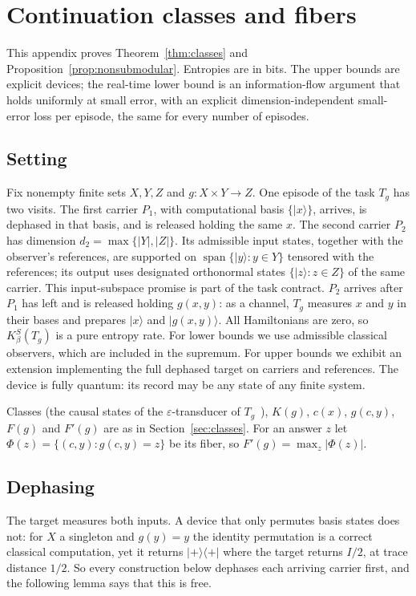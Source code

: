 \section{Continuation classes and fibers}\label{app:classes}

This appendix proves Theorem~\ref{thm:classes} and Proposition~\ref{prop:nonsubmodular}. Entropies are in bits. The upper bounds are explicit devices; the real-time lower bound is an information-flow argument that holds uniformly at small error, with an explicit dimension-independent small-error loss per episode, the same for every number of episodes.

\subsection{Setting}

Fix nonempty finite sets $X,Y,Z$ and $g:X\times Y\to Z$. One episode of the task $T_g$ has two visits. The first carrier $P_1$, with computational basis $\{|x\rangle\}$, arrives, is dephased in that basis, and is released holding the same $x$. The second carrier $P_2$ has dimension $d_2=\max\{|Y|,|Z|\}$. Its admissible input states, together with the observer's references, are supported on $\operatorname{span}\{|y\rangle:y\in Y\}$ tensored with the references; its output uses designated orthonormal states $\{|z\rangle:z\in Z\}$ of the same carrier. This input-subspace promise is part of the task contract. $P_2$ arrives after $P_1$ has left and is released holding $g(x,y)$: as a channel, $T_g$ measures $x$ and $y$ in their bases and prepares $|x\rangle$ and $|g(x,y)\rangle$. All Hamiltonians are zero, so $K_\beta^S(T_g)$ is a pure entropy rate. For lower bounds we use admissible classical observers, which are included in the supremum. For upper bounds we exhibit an extension implementing the full dephased target on carriers and references. The device is fully quantum: its record may be any state of any finite system.

Classes (the causal states of the $\varepsilon$-transducer of $T_g$~\cite{BarnettCrutchfield15}), $K(g)$, $c(x)$, $g(c,y)$, $F(g)$ and $F'(g)$ are as in Section~\ref{sec:classes}. For an answer $z$ let $\Phi(z)=\{(c,y):g(c,y)=z\}$ be its fiber, so $F'(g)=\max_z|\Phi(z)|$.

\subsection{Dephasing}

The target measures both inputs. A device that only permutes basis states does not: for $X$ a singleton and $g(y)=y$ the identity permutation is a correct classical computation, yet it returns $|+\rangle\langle+|$ where the target returns $I/2$, at trace distance $1/2$. So every construction below dephases each arriving carrier first, and the following lemma says that this is free.

